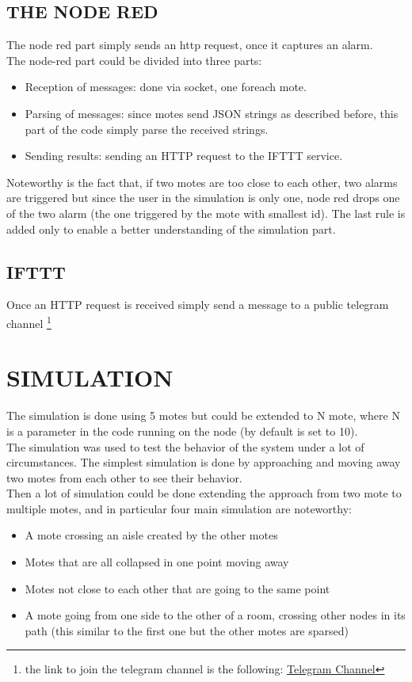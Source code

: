 \documentclass{article}
\begin{document}
\subsection{THE NODE RED}
The node red part simply sends an http request, once it captures an alarm.\\
The node-red part could be divided into three parts:
\begin{itemize}
    \item Reception of messages: done via socket, one foreach mote.
    \item Parsing of messages: since motes send JSON strings as described before, this part of the code simply parse the received strings.
    \item Sending results: sending an HTTP request to the IFTTT service.
\end{itemize}
Noteworthy is the fact that, if two motes are too close to each other, two alarms are triggered but since the user in the simulation is only one, node red drops one of the two alarm (the one triggered by the mote with smallest id). The last rule is added only to enable a better understanding of the simulation part.
\subsection{IFTTT}
Once an HTTP request is received simply send a message to a public telegram channel \footnote{the link to join the telegram channel is the following: \href{https://t.me/iot_project_shalby}{Telegram Channel}}

\section{SIMULATION}

The simulation is done using 5 motes but could be extended to N mote, where N is a parameter in the code running on the node (by default is set to 10).\\
The simulation was used to test the behavior of the system under a lot of circumstances.
The simplest simulation is done by approaching and moving away two motes from each other to see their behavior.\\
Then a lot of simulation could be done extending the approach from two mote to multiple motes, and in particular four main simulation are noteworthy:
\begin{itemize}
    \item A mote crossing an aisle created by the other motes
    \item Motes that are all collapsed in one point moving away
    \item Motes not close to each other that are going to the same point
    \item A mote going from one side to the other of a room, crossing other nodes in its path (this similar to the first one but the other motes are sparsed)
\end{itemize}
\end{document}
